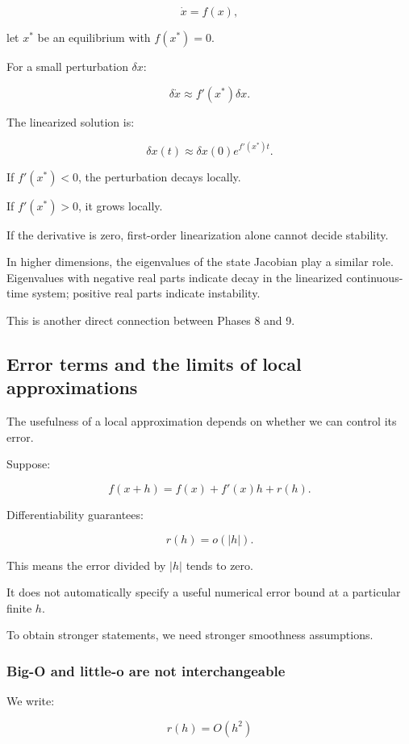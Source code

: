 \[
\dot x=f(x),
\]

let \(x^\ast\) be an equilibrium with \(f(x^\ast)=0\).

For a small perturbation \(\delta x\):

\[
\delta\dot x\approx f'(x^\ast)\delta x.
\]

The linearized solution is:

\[
\delta x(t)\approx\delta x(0)e^{f'(x^\ast)t}.
\]

If \(f'(x^\ast)<0\), the perturbation decays locally.

If \(f'(x^\ast)>0\), it grows locally.

If the derivative is zero, first-order linearization alone cannot decide stability.

In higher dimensions, the eigenvalues of the state Jacobian play a similar role. Eigenvalues with negative real parts indicate decay in the linearized continuous-time system; positive real parts indicate instability.

This is another direct connection between Phases 8 and 9.

\subsection{Error terms and the limits of local approximations}\label{02-foundations-ii-ch021-error-terms-and-the-limits-of-local-approximations}

The usefulness of a local approximation depends on whether we can control its error.

Suppose:

\[
f(x+h)=f(x)+f'(x)h+r(h).
\]

Differentiability guarantees:

\[
r(h)=o(|h|).
\]

This means the error divided by \(|h|\) tends to zero.

It does not automatically specify a useful numerical error bound at a particular finite \(h\).

To obtain stronger statements, we need stronger smoothness assumptions.

\subsubsection{Big-O and little-o are not interchangeable}\label{02-foundations-ii-ch021-big-o-and-little-o-are-not-interchangeable}

We write:

\[
r(h)=O(h^2)
\]

